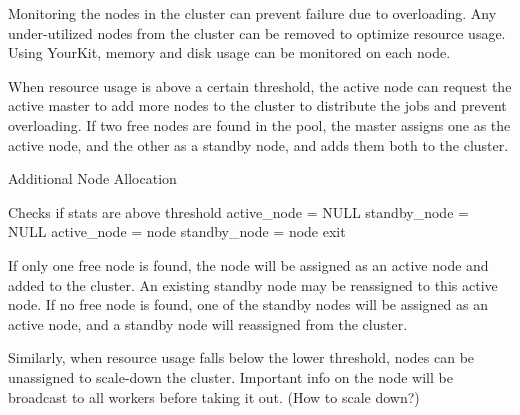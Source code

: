 \documentclass[conference]{IEEEtran}
\begin{document}
Monitoring the nodes in the cluster can prevent failure due to overloading. Any under-utilized nodes from the cluster can be removed to optimize resource usage. Using YourKit, memory and disk usage can be monitored on each node.

When resource usage is above a certain threshold, the active node can request the active master to add more nodes to the cluster to distribute the jobs and prevent overloading. If two free nodes are found in the pool, the master assigns one as the active node, and the other as a standby node, and adds them both to the cluster.

\begin{algorithm}
    \caption{Additional Node Allocation}
    \begin{algorithmic}[1]
            \LineComment Checks if stats are above threshold
                \State active{\_}node = NULL
                \State standby{\_}node = NULL
                        \State active{\_}node = node
                        \State standby{\_}node = node
                    \Else
                        \State exit
                    \EndIf
                \EndIf
            \EndFor
            \EndIf
        \EndFunction
    \end{algorithmic}
\end{algorithm}

If only one free node is found, the node will be assigned as an active node and added to the cluster. An existing standby node may be reassigned to this active node. If no free node is found, one of the standby nodes will be assigned as an active node, and a standby node will reassigned from the cluster.

Similarly, when resource usage falls below the lower threshold, nodes can be unassigned to scale-down the cluster. Important info on the node will be broadcast to all workers before taking it out. (How to scale down?)
\end{document}
